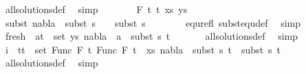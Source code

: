 \begin{isabellebody}
\ all{\isacharunderscore}{\kern0pt}solutions{\isacharunderscore}{\kern0pt}def\ \isamarkupfalse%
\ simp\isanewline
\ \isamarkupfalse%
\isanewline
\ \ \ \isamarkupfalse%
\ {\isacharparenleft}{\kern0pt}{}\ F\ t{}\ t{}\ xs\ ys{\isacharparenright}{\kern0pt}\isanewline
\ \ \ \isamarkupfalse%
\ \isamarkupfalse%
\ subst{\isacharcolon}{\kern0pt}\ {\isachardoublequoteopen}nabla{}\ {\isasymTurnstile}\ subst\ {\isacharparenleft}{\kern0pt}s{}\ {\isasymbullet}\ {\isacharbrackleft}{\kern0pt}{\isacharbrackright}{\kern0pt}{\isacharparenright}{\kern0pt}\ {\isasymapprox}\ subst\ s{}{\isachardoublequoteclose}\ \isanewline
\ \ \ \ \ \isamarkupfalse%
\ equ{\isacharunderscore}{\kern0pt}refl\ subst{\isacharunderscore}{\kern0pt}equ{\isacharunderscore}{\kern0pt}def\ \isamarkupfalse%
\ simp\isanewline
\isanewline
\ \ \ \isamarkupfalse%
\ {}\isanewline
\ \ \ \isamarkupfalse%
\ fresh{\isacharcolon}{\kern0pt}\ {\isachardoublequoteopen}{\isasymforall}\ {\isacharparenleft}{\kern0pt}a{\isacharcomma}{\kern0pt}t{\isacharparenright}{\kern0pt}\ {\isasymin}\ set\ ys{\isachardot}{\kern0pt}\ nabla{}\ {\isasymturnstile}\ a\ {\isasymsharp}\ subst\ s{}\ t{\isachardoublequoteclose}\isanewline
\ \ \ \ \ \isamarkupfalse%
\ all{\isacharunderscore}{\kern0pt}solutions{\isacharunderscore}{\kern0pt}def\ \isamarkupfalse%
\ simp\isanewline
\isanewline
\ \ \ \isamarkupfalse%
\ {}\isanewline
\ \ \ \isamarkupfalse%
\ i{\isacharcolon}{\kern0pt}\ {\isachardoublequoteopen}{\isasymforall}\ {\isacharparenleft}{\kern0pt}t{}{\isacharcomma}{\kern0pt}t{}{\isacharparenright}{\kern0pt}\ {\isasymin}\ set\ {\isacharparenleft}{\kern0pt}{\isacharparenleft}{\kern0pt}Func\ F\ t{}{\isacharcomma}{\kern0pt}\ Func\ F\ t{}{\isacharparenright}{\kern0pt}\ {\isacharhash}{\kern0pt}\ xs{\isacharparenright}{\kern0pt}{\isachardot}{\kern0pt}\ nabla{}\ {\isasymturnstile}\ subst\ s{}\ t{}\ {\isasymapprox}\ subst\ s{}\ t{}{\isachardoublequoteclose}\isanewline
\ \ \ \ \ \isamarkupfalse%
\ all{\isacharunderscore}{\kern0pt}solutions{\isacharunderscore}{\kern0pt}def\ \isamarkupfalse%
\ simp\isanewline
\ \ \ \isamarkupfalse%

\end{isabellebody}
